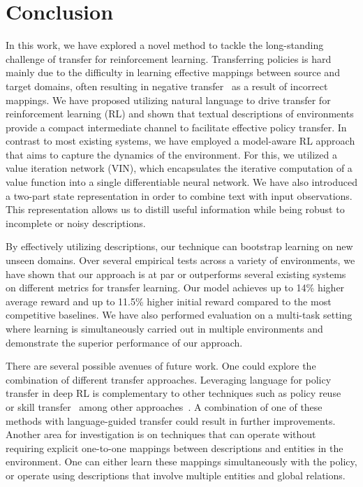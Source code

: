 \section{Conclusion}
\label{sec:conclusions}
In this work, we have explored a novel method to tackle the long-standing challenge of transfer for reinforcement learning. Transferring policies is hard mainly due to the difficulty in learning effective mappings between source and target domains, often resulting in negative transfer~\cite{taylor2009transfer} as a result of incorrect mappings.
We have proposed utilizing natural language to drive transfer for reinforcement learning (RL) and shown that textual descriptions of environments provide a compact intermediate channel to facilitate effective policy transfer. In contrast to most existing systems, we have employed a model-aware RL approach that aims to capture the dynamics of the environment. For this, we utilized a value iteration network (VIN), which encapsulates the iterative computation of a value function into a single differentiable neural network. We have also introduced a two-part state representation in order to combine text with input observations.
This representation allows us to distill useful information while being robust to incomplete or noisy descriptions.

By effectively utilizing descriptions, our technique can bootstrap learning on new unseen domains. Over several empirical tests across a variety of environments, we have shown that our approach is at par or outperforms several existing systems on different metrics for transfer learning. Our model achieves up to 14\% higher average reward and up to 11.5\% higher initial reward compared to the most competitive baselines. We have also performed evaluation on a multi-task setting where learning is simultaneously carried out in multiple environments and demonstrate the superior performance of our approach.

There are several possible avenues of future work. One could explore the combination of different transfer approaches. Leveraging language for policy transfer in deep RL is complementary to other techniques such as policy reuse~ or skill transfer~ among other approaches~. A combination of one of these methods with language-guided transfer could result in further improvements.
Another area for investigation is on techniques that can operate without requiring explicit one-to-one mappings between descriptions and entities in the environment. One can either learn these mappings simultaneously with the policy, or operate using descriptions that involve multiple entities and global relations.

